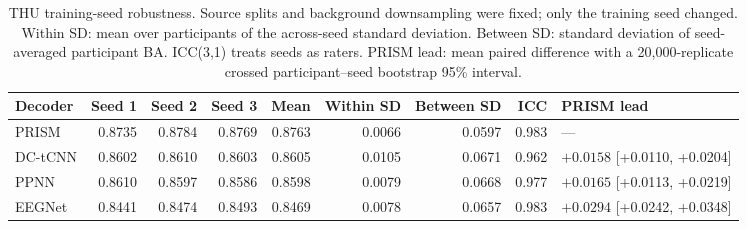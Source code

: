 \begin{table}[H]
\centering
\caption{THU training-seed robustness. Source splits and background downsampling were fixed; only the training seed changed. Within SD: mean over participants of the across-seed standard deviation. Between SD: standard deviation of seed-averaged participant BA. ICC(3,1) treats seeds as raters. PRISM lead: mean paired difference with a 20{,}000-replicate crossed participant--seed bootstrap 95\% interval.}
\label{tab:supp-seeds}
\scriptsize
\begin{adjustbox}{max width=\textwidth}
\begin{tabular}{@{}lrrrrrrrl@{}}
\toprule
Decoder & Seed 1 & Seed 2 & Seed 3 & Mean & Within SD & Between SD & ICC & PRISM lead \\
\midrule
PRISM & 0.8735 & 0.8784 & 0.8769 & 0.8763 & 0.0066 & 0.0597 & 0.983 & --- \\
DC-tCNN & 0.8602 & 0.8610 & 0.8603 & 0.8605 & 0.0105 & 0.0671 & 0.962 & $+0.0158$ [+0.0110, +0.0204] \\
PPNN & 0.8610 & 0.8597 & 0.8586 & 0.8598 & 0.0079 & 0.0668 & 0.977 & $+0.0165$ [+0.0113, +0.0219] \\
EEGNet & 0.8441 & 0.8474 & 0.8493 & 0.8469 & 0.0078 & 0.0657 & 0.983 & $+0.0294$ [+0.0242, +0.0348] \\
\bottomrule
\end{tabular}
\end{adjustbox}
\end{table}
